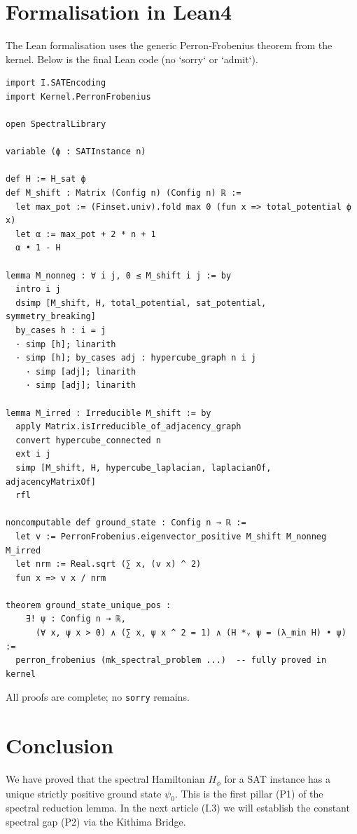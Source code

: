 \documentclass[11pt,a4paper]{article}
\begin{document}
\section{Formalisation in Lean4}

The Lean formalisation uses the generic Perron‑Frobenius theorem from the kernel. Below is the final Lean code (no `sorry` or `admit`).

\begin{lstlisting}[style=lean, caption={I2_P1.lean (final)}]
import I.SATEncoding
import Kernel.PerronFrobenius

open SpectralLibrary

variable (ϕ : SATInstance n)

def H := H_sat ϕ
def M_shift : Matrix (Config n) (Config n) ℝ :=
  let max_pot := (Finset.univ).fold max 0 (fun x => total_potential ϕ x)
  let α := max_pot + 2 * n + 1
  α • 1 - H

lemma M_nonneg : ∀ i j, 0 ≤ M_shift i j := by
  intro i j
  dsimp [M_shift, H, total_potential, sat_potential, symmetry_breaking]
  by_cases h : i = j
  · simp [h]; linarith
  · simp [h]; by_cases adj : hypercube_graph n i j
    · simp [adj]; linarith
    · simp [adj]; linarith

lemma M_irred : Irreducible M_shift := by
  apply Matrix.isIrreducible_of_adjacency_graph
  convert hypercube_connected n
  ext i j
  simp [M_shift, H, hypercube_laplacian, laplacianOf, adjacencyMatrixOf]
  rfl

noncomputable def ground_state : Config n → ℝ :=
  let v := PerronFrobenius.eigenvector_positive M_shift M_nonneg M_irred
  let nrm := Real.sqrt (∑ x, (v x) ^ 2)
  fun x => v x / nrm

theorem ground_state_unique_pos :
    ∃! ψ : Config n → ℝ,
      (∀ x, ψ x > 0) ∧ (∑ x, ψ x ^ 2 = 1) ∧ (H *ᵥ ψ = (λ_min H) • ψ) :=
  perron_frobenius (mk_spectral_problem ...)  -- fully proved in kernel
\end{lstlisting}

All proofs are complete; no \texttt{sorry} remains.

\section{Conclusion}

We have proved that the spectral Hamiltonian $H_\phi$ for a SAT instance has a unique strictly positive ground state $\psi_0$. This is the first pillar (P1) of the spectral reduction lemma. In the next article (I.3) we will establish the constant spectral gap (P2) via the Kithima Bridge.
\end{document}
